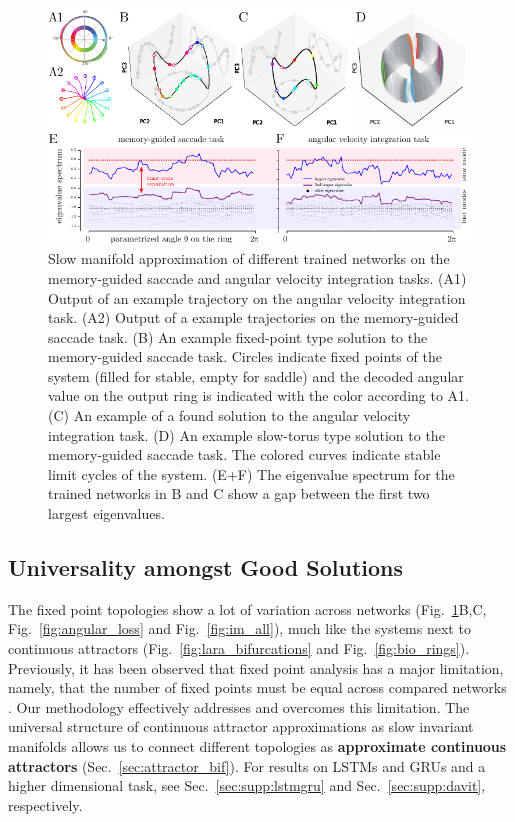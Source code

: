 \documentclass{article} %
\newcounter{ct}
\theoremstyle{definition}
\theoremstyle{remark}
\begin{document}
\begin{figure}[tbhp]
  \centering
  \includegraphics[width=.95\textwidth]{fastslow_decomposition_normhyp_s}
  \caption{Slow manifold approximation of different trained networks on the memory-guided saccade and angular velocity integration tasks.
 (A1) Output of an example trajectory on the angular velocity integration task.
 (A2) Output of a example trajectories on the memory-guided saccade task.
 (B) An example fixed-point type solution to the memory-guided saccade task. Circles indicate fixed points of the system (filled for stable, empty for saddle) and the decoded angular value on the output ring is indicated with the color according to A1.
 (C) An example of a found solution to the angular velocity integration task.
 (D) An example slow-torus type solution to the memory-guided saccade task. The colored curves indicate stable limit cycles of the system.
 (E+F) The eigenvalue spectrum for the trained networks in B and C show a gap between the first two largest eigenvalues.
}\label{fig:fastslow_decomposition}
\end{figure}

\vspace{-.8cm}

\subsection{Universality amongst Good Solutions}
The fixed point topologies show a lot of variation across networks (Fig.~\ref{fig:fastslow_decomposition}B,C, Fig.~\ref{fig:angular_loss} and Fig.~\ref{fig:im_all}),
 much like the systems next to continuous attractors (Fig.~\ref{fig:lara_bifurcations} and Fig.~\ref{fig:bio_rings}).
Previously, it has been observed that fixed point analysis has a major limitation, namely, that the number of fixed points must be equal across compared networks  \citep{maheswaranathan2019universality}.
Our methodology effectively addresses and overcomes this limitation.
The universal structure of continuous attractor approximations as slow invariant manifolds allows us to connect different topologies as \textbf{approximate continuous attractors} (Sec.~\ref{sec:attractor_bif}).
For results on LSTMs and GRUs and a higher dimensional task, see Sec.~\ref{sec:supp:lstmgru} and  Sec.~\ref{sec:supp:davit}, respectively.
\end{document}
